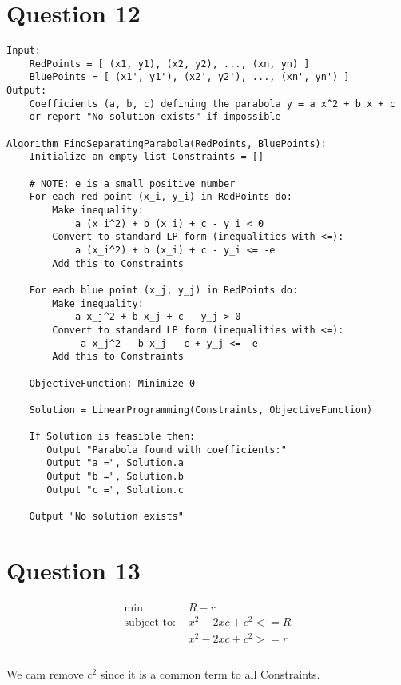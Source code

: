 \documentclass{article}
\begin{document}
\section*{Question 12}
\begin{verbatim}
Input: 
    RedPoints = [ (x1, y1), (x2, y2), ..., (xn, yn) ]
    BluePoints = [ (x1', y1'), (x2', y2'), ..., (xn', yn') ]
Output:
    Coefficients (a, b, c) defining the parabola y = a x^2 + b x + c
    or report "No solution exists" if impossible

Algorithm FindSeparatingParabola(RedPoints, BluePoints): 
    Initialize an empty list Constraints = []

    # NOTE: e is a small positive number
    For each red point (x_i, y_i) in RedPoints do:
        Make inequality:
            a (x_i^2) + b (x_i) + c - y_i < 0
        Convert to standard LP form (inequalities with <=):
            a (x_i^2) + b (x_i) + c - y_i <= -e
        Add this to Constraints

    For each blue point (x_j, y_j) in RedPoints do:
        Make inequality:
            a x_j^2 + b x_j + c - y_j > 0
        Convert to standard LP form (inequalities with <=):
            -a x_j^2 - b x_j - c + y_j <= -e
        Add this to Constraints

    ObjectiveFunction: Minimize 0

    Solution = LinearProgramming(Constraints, ObjectiveFunction)

    If Solution is feasible then:
       Output "Parabola found with coefficients:"
       Output "a =", Solution.a
       Output "b =", Solution.b
       Output "c =", Solution.c

    Output "No solution exists"
\end{verbatim}

\newpage

\section*{Question 13}
\begin{align*}
    \text{min } & R - r \\
    \text{subject to: } & x^2 - 2xc + c^2 <= R \\
                        & x^2 - 2xc + c^2 >= r \\
\end{align*}
\\
We cam remove $c^2$ since it is a common term to all Constraints.
\end{document}
